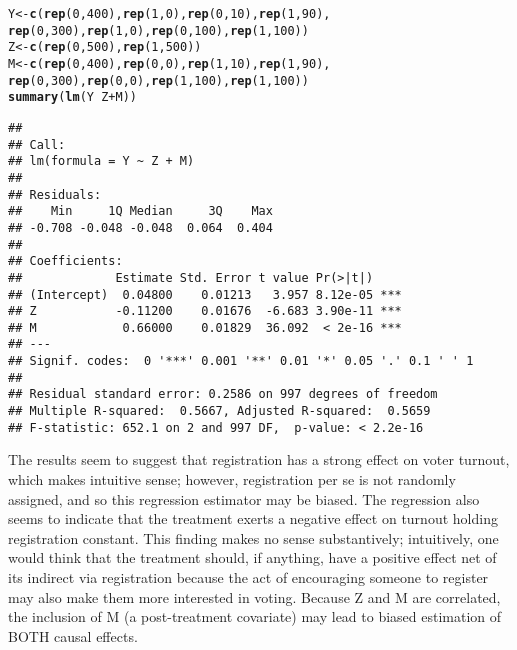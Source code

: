 \documentclass[11pt,notitlepage]{article}\usepackage[]{graphicx}\usepackage[]{color}
\makeatletter
\newcommand{\hlnum}[1]{\textcolor[rgb]{0.686,0.059,0.569}{#1}}%
\newcommand{\hlopt}[1]{\textcolor[rgb]{0,0,0}{#1}}%
\newcommand{\hlstd}[1]{\textcolor[rgb]{0.345,0.345,0.345}{#1}}%
\newcommand{\hlkwb}[1]{\textcolor[rgb]{0.69,0.353,0.396}{#1}}%
\newcommand{\hlkwd}[1]{\textcolor[rgb]{0.737,0.353,0.396}{\textbf{#1}}}%
\newenvironment{kframe}{%
 \def\at@end@of@kframe{}%
 \ifinner\ifhmode%
  \def\at@end@of@kframe{\end{minipage}}%
  \begin{minipage}{\columnwidth}%
 \fi\fi%
 \def\FrameCommand##1{\hskip\@totalleftmargin \hskip-\fboxsep
 \colorbox{shadecolor}{##1}\hskip-\fboxsep
     \hskip-\linewidth \hskip-\@totalleftmargin \hskip\columnwidth}%
 \MakeFramed {\advance\hsize-\width
   \@totalleftmargin\z@ \linewidth\hsize
   \@setminipage}}%
 {\par\unskip\endMakeFramed%
 \at@end@of@kframe}
\newenvironment{knitrout}{}{} %
\makeatother
\begin{document}
\begin{enumerate}[a)]
\begin{knitrout}
\color{fgcolor}\begin{kframe}
\begin{alltt}
\hlstd{Y} \hlkwb{<-} \hlkwd{c}\hlstd{(}\hlkwd{rep}\hlstd{(}\hlnum{0}\hlstd{,} \hlnum{400}\hlstd{),} \hlkwd{rep}\hlstd{(}\hlnum{1}\hlstd{,} \hlnum{0}\hlstd{),} \hlkwd{rep}\hlstd{(}\hlnum{0}\hlstd{,} \hlnum{10}\hlstd{),} \hlkwd{rep}\hlstd{(}\hlnum{1}\hlstd{,} \hlnum{90}\hlstd{),}
       \hlkwd{rep}\hlstd{(}\hlnum{0}\hlstd{,} \hlnum{300}\hlstd{),} \hlkwd{rep}\hlstd{(}\hlnum{1}\hlstd{,} \hlnum{0}\hlstd{),} \hlkwd{rep}\hlstd{(}\hlnum{0}\hlstd{,} \hlnum{100}\hlstd{),} \hlkwd{rep}\hlstd{(}\hlnum{1}\hlstd{,} \hlnum{100}\hlstd{))}
\hlstd{Z} \hlkwb{<-} \hlkwd{c}\hlstd{(}\hlkwd{rep}\hlstd{(}\hlnum{0}\hlstd{,} \hlnum{500}\hlstd{),} \hlkwd{rep}\hlstd{(}\hlnum{1}\hlstd{,} \hlnum{500}\hlstd{))}
\hlstd{M} \hlkwb{<-} \hlkwd{c}\hlstd{(}\hlkwd{rep}\hlstd{(}\hlnum{0}\hlstd{,} \hlnum{400}\hlstd{),} \hlkwd{rep}\hlstd{(}\hlnum{0}\hlstd{,} \hlnum{0}\hlstd{),} \hlkwd{rep}\hlstd{(}\hlnum{1}\hlstd{,} \hlnum{10}\hlstd{),} \hlkwd{rep}\hlstd{(}\hlnum{1}\hlstd{,} \hlnum{90}\hlstd{),}
       \hlkwd{rep}\hlstd{(}\hlnum{0}\hlstd{,} \hlnum{300}\hlstd{),} \hlkwd{rep}\hlstd{(}\hlnum{0}\hlstd{,} \hlnum{0}\hlstd{),} \hlkwd{rep}\hlstd{(}\hlnum{1}\hlstd{,} \hlnum{100}\hlstd{),} \hlkwd{rep}\hlstd{(}\hlnum{1}\hlstd{,} \hlnum{100}\hlstd{))}
\hlkwd{summary}\hlstd{(}\hlkwd{lm}\hlstd{(Y}\hlopt{~} \hlstd{Z} \hlopt{+} \hlstd{M))}
\end{alltt}
\begin{verbatim}
## 
## Call:
## lm(formula = Y ~ Z + M)
## 
## Residuals:
##    Min     1Q Median     3Q    Max 
## -0.708 -0.048 -0.048  0.064  0.404 
## 
## Coefficients:
##             Estimate Std. Error t value Pr(>|t|)    
## (Intercept)  0.04800    0.01213   3.957 8.12e-05 ***
## Z           -0.11200    0.01676  -6.683 3.90e-11 ***
## M            0.66000    0.01829  36.092  < 2e-16 ***
## ---
## Signif. codes:  0 '***' 0.001 '**' 0.01 '*' 0.05 '.' 0.1 ' ' 1
## 
## Residual standard error: 0.2586 on 997 degrees of freedom
## Multiple R-squared:  0.5667,	Adjusted R-squared:  0.5659 
## F-statistic: 652.1 on 2 and 997 DF,  p-value: < 2.2e-16
\end{verbatim}
\end{kframe}
\end{knitrout}

The results seem to suggest that registration has a strong effect on voter turnout, which makes intuitive sense; however, registration per se is not randomly assigned, and so this regression estimator may be biased. The regression also seems to indicate that the treatment exerts a negative effect on turnout holding registration constant. This finding makes no sense substantively; intuitively, one would think that the treatment should, if anything, have a positive effect net of its indirect via registration because the act of encouraging someone to register may also make them more interested in voting. Because Z and M are correlated, the inclusion of M (a post-treatment covariate) may lead to biased estimation of BOTH causal effects.


\end{enumerate}
\end{document}
